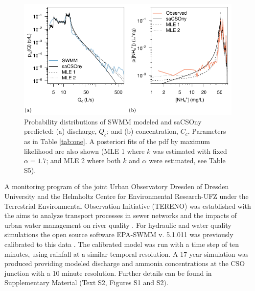 \documentclass{agujournal2018}
\begin{document}
\begin{figure}[ht]
 \centering
 \includegraphics[width=30pc]{Fig5.pdf}
 \caption{Probability distributions of SWMM modeled and saCSOny predicted: (a) discharge, $Q_c$;  and (b) concentration, $C_c$. Parameters as in Table \ref{tab:one}. A posteriori f\/its of the pdf by maximum likelihood are also shown (MLE 1 where  $k$ was estimated with f\/ixed  $\alpha = 1.7$; and MLE 2 where both $k$ and  $\alpha$ were estimated, see Table S5).}
 \label{figfive}
 \end{figure}
 
A monitoring program of the joint Urban Observatory Dresden of Dresden University and the Helmholtz Centre for Environmental Research-UFZ under the Terrestrial Environmental Observation Initiative (TERENO) was established with the aims to analyze transport processes in sewer networks and the impacts of urban water management on river quality \citep{Helm2015, Wollschl_ger_2016}. For hydraulic and water quality simulations the open source software EPA-SWMM v. 5.1.011 was previously calibrated to this data \citep{Deb_2002,Kaeseberg_2018,Rossmann2010,steinberg2015}. The calibrated model was run with a time step of ten minutes, using rainfall at a similar temporal resolution. A 17 year simulation was produced providing modeled discharge and ammonia concentrations at the CSO junction with a 10 minute resolution. Further details can be found in Supplementary Material (Text S2, Figures S1 and S2).
 
\end{document}
